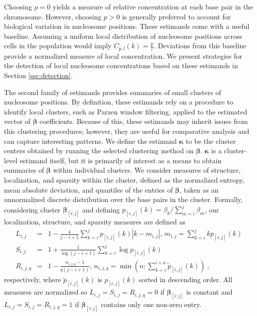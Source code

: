 Choosing $p = 0$ yields a measure of relative concentration at each base pair in the chromosome.
However, choosing $p > 0$ is generally preferred to account for biological variation in nucleosome positions.
These estimands come with a useful baseline.
Assuming a uniform local distribution of nucleosome positions across cells in the population would imply $C_{p,l}(k) = \frac{p}{l}$.
Deviations from this baseline provide a normalized measure of local concentration.
We present strategies for the detection of local nucleosome concentrations based on these estimands in Section \ref{sec:detection}.

The second family of estimands provides summaries of small clusters of nucleosome positions.
By definition, these estimands rely on a procedure to identify local clusters, such as Parzen window filtering, applied to the estimated vector of $\bm \beta$ coefficients.
Because of this, these estimands may inherit issues from this clustering procedures; however, they are useful for comparative analysis and can capture interesting patterns.
We define the estimand $\bm \kappa$ to be the cluster centers obtained by running the selected clustering method on $\bm \beta$.
$\bm \kappa$ is a cluster-level estimand itself, but it is primarily of interest as a means to obtain summaries of $\bm \beta$ within individual clusters.
We consider
measures of structure, localization, and sparsity within the cluster, defined as the normalized entropy, mean absolute deviation, and quantiles of the entries of $\bm \beta$, taken as an unnormalized discrete distribution over the base pairs in the cluster.
Formally, considering cluster $\bm \beta_{[i:j]}$ and defining $p_{[i,j]}(k) = \beta_k / \sum_{m=i}^{j} \beta_m$, our localization, structure, and sparsity measures are defined as
\begin{eqnarray}
L_{i,j} &=&  1 - \frac{4}{j - i + 1} \sum_{k=i}^{j} p_{[i,j]}(k) |k - m_{i,j}|, \, m_{i,j} = \sum_{k=i}^{j} k p_{[i,j]}(k) \label{eq:localization} \\
S_{i,j} &=&  1 + \frac{1}{\log(j - i + 1)} \sum_{k=i}^{j} \log p_{[i,j]}(k) \label{eq:structure} \\
R_{i,j,q} &=& 1 - \frac{n_{i,j,q} - 1}{q (j - i + 1)}, \, n_{i,j,q} = \min\left(n : \sum_{k=i}^{i + n} \tilde{p}_{[i,j]}(k) \right) \label{eq:sparsity} \ ,
\end{eqnarray}
respectively, where $\tilde{p}_{[i,j]}(k)$ is $p_{[i,j]}(k)$ sorted in descending order.
All measures are normalized so $L_{i,j} = S_{i,j} = R_{i,j,q} = 0$ if $\bm \beta_{[i:j]}$ is constant and $L_{i,j} = S_{i,j} = R_{i,j,q} = 1$ if $\bm \beta_{[i:j]}$ contains only one non-zero entry.

